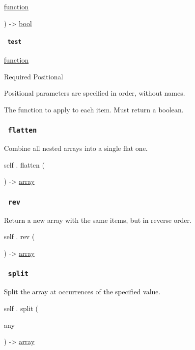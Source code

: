 { \href{/docs/reference/foundations/function/}{function} }

) -\textgreater{} \href{/docs/reference/foundations/bool/}{bool}

\paragraph{\texorpdfstring{\texttt{\ test\ }}{ test }}\label{definitions-all-test}

\href{/docs/reference/foundations/function/}{function}

{Required} {{ Positional }}

\label{definitions-all-test-positional-tooltip}
Positional parameters are specified in order, without names.

The function to apply to each item. Must return a boolean.

\subsubsection{\texorpdfstring{\texttt{\ flatten\ }}{ flatten }}\label{definitions-flatten}

Combine all nested arrays into a single flat one.

self { . } { flatten } (

) -\textgreater{} \href{/docs/reference/foundations/array/}{array}

\subsubsection{\texorpdfstring{\texttt{\ rev\ }}{ rev }}\label{definitions-rev}

Return a new array with the same items, but in reverse order.

self { . } { rev } (

) -\textgreater{} \href{/docs/reference/foundations/array/}{array}

\subsubsection{\texorpdfstring{\texttt{\ split\ }}{ split }}\label{definitions-split}

Split the array at occurrences of the specified value.

self { . } { split } (

{ { any } }

) -\textgreater{} \href{/docs/reference/foundations/array/}{array}

